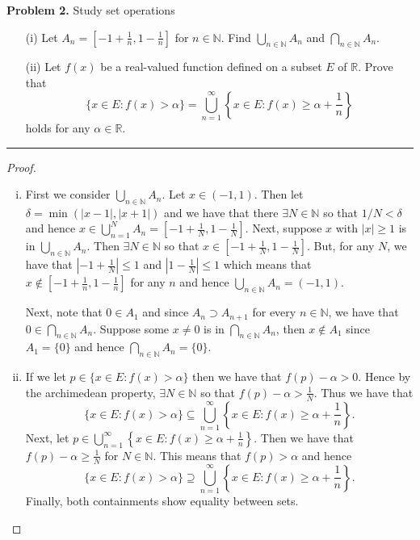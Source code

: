\documentclass[leqno]{article}
\theoremstyle{nonumberplain}
\newtheorem{proof}{Proof}
\newcommand{\N}{\mathbb{N}}
\begin{document}
\noindent\textbf{Problem 2.} \quad
Study set operations
\begin{itemize}
\item [(i)]
  Let $ \displaystyle A_n = \left[ -1+\frac{1}{n}, 1-\frac{1}{n} \right] $
  for $ n \in \mathbb{N} $.
  Find $ \displaystyle \bigcup_{n \in \mathbb{N}} A_n $
  and $ \displaystyle \bigcap_{n \in \mathbb{N}} A_n $.
\item [(ii)]
  Let $ f(x) $ be a real-valued function
  defined on a subset $ E $ of $ \mathbb{R} $.
  Prove that
  $$
    \displaystyle
    \{ x \in E: f(x)>\alpha \}
    = \bigcup_{n=1}^\infty \left\{ x \in E: f(x) \ge \alpha + \frac{1}{n} \right\}
  $$
  holds for any $ \alpha \in \mathbb{R} $.
\end{itemize}

\noindent\rule[0.5ex]{\linewidth}{1pt}


\begin{proof}~
\begin{enumerate}[(i)]
\item First we consider $\bigcup_{n\in \N} A_n$.  Let $x\in (-1,1)$.  Then let $\delta=\min (|x-1|,|x+1|)$ and we have that there $\exists N \in \N$ so that $1/N<\delta$ and hence $x\in \bigcup_{n=1}^N A_n = \left[-1+\frac{1}{N},1-\frac{1}{N}\right]$. Next, suppose $x$ with $|x|\geq 1$ is in $\bigcup_{n\in \N} A_n$.  Then $\exists N \in \N$ so that $x \in \left[-1+\frac{1}{N},1-\frac{1}{N}\right]$. But, for any $N$, we have that $\left| -1+\frac{1}{N}\right|\leq 1$ and $\left| 1-\frac{1}{N}\right| \leq 1$ which means that $x \notin \left[ -1 +\frac{1}{n},1-\frac{1}{n}\right]$ for any $n$ and hence $\bigcup_{n\in \N} A_n = (-1,1)$.

Next, note that $0\in A_1$ and since $A_n \supset A_{n+1}$ for every $n\in \N$, we have that $0 \in \bigcap_{n\in \N} A_n$.  Suppose some $x\neq 0$ is in $\bigcap_{n\in \N} A_n$, then $x\notin A_1$ since $A_1 = \{0\}$ and hence $\bigcap_{n\in \N} A_n = \{0\}$.

\item If we let $p\in \{x\in E \colon f(x)>\alpha\}$ then we have that $f(p)-\alpha>0$.  Hence by the archimedean property, $\exists N \in \N$ so that $f(p)-\alpha> \frac{1}{N}$.  Thus we have that 
\[
\{x\in E \colon f(x)> \alpha \} \subseteq \bigcup_{n=1}^\infty \left\{ x \in E \colon f(x)\geq \alpha +\frac{1}{n} \right\}.
\]
Next, let $p\in \bigcup_{n=1}^\infty \left\{ x \in E \colon f(x)\geq \alpha +\frac{1}{n} \right\}$.  Then we have that $f(p)-\alpha \geq \frac{1}{N}$ for $N\in \N$.  This means that $f(p)>\alpha$ and hence
\[
\{x\in E \colon f(x)> \alpha \} \supseteq \bigcup_{n=1}^\infty \left\{ x \in E \colon f(x)\geq \alpha +\frac{1}{n} \right\}.
\]
Finally, both containments show equality between sets.
\end{enumerate}
\end{proof}
\end{document}
